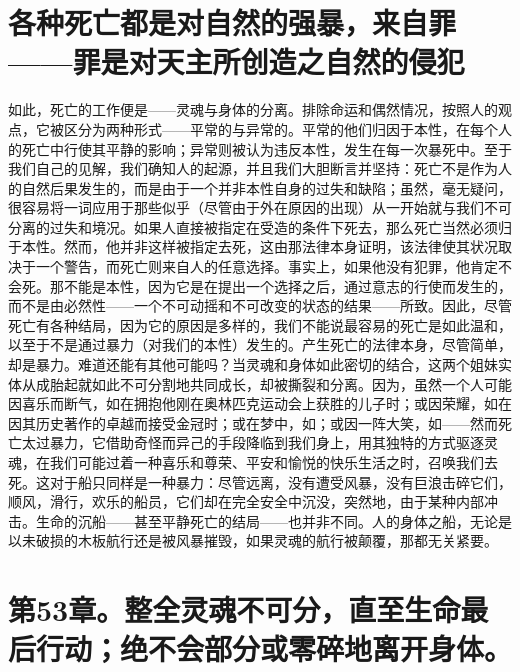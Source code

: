 
\section{各种死亡都是对自然的强暴，来自罪——罪是对天主所创造之自然的侵犯}

如此，死亡的工作便是——灵魂与身体的分离。排除命运和偶然情况，按照人的观点，它被区分为两种形式——平常的与异常的。平常的他们归因于本性，在每个人的死亡中行使其平静的影响；异常则被认为违反本性，发生在每一次暴死中。至于我们自己的见解，我们确知人的起源，并且我们大胆断言并坚持：死亡不是作为人的自然后果发生的，而是由于一个并非本性自身的过失和缺陷；虽然，毫无疑问，很容易将一词应用于那些似乎（尽管由于外在原因的出现）从一开始就与我们不可分离的过失和境况。如果人直接被指定在受造的条件下死去，那么死亡当然必须归于本性。然而，他并非这样被指定去死，这由那法律本身证明，该法律使其状况取决于一个警告，而死亡则来自人的任意选择。事实上，如果他没有犯罪，他肯定不会死。那不能是本性，因为它是在提出一个选择之后，通过意志的行使而发生的，而不是由必然性——一个不可动摇和不可改变的状态的结果——所致。因此，尽管死亡有各种结局，因为它的原因是多样的，我们不能说最容易的死亡是如此温和，以至于不是通过暴力（对我们的本性）发生的。产生死亡的法律本身，尽管简单，却是暴力。难道还能有其他可能吗？当灵魂和身体如此密切的结合，这两个姐妹实体从成胎起就如此不可分割地共同成长，却被撕裂和分离。因为，虽然一个人可能因喜乐而断气，如在拥抱他刚在奥林匹克运动会上获胜的儿子时；或因荣耀，如在因其历史著作的卓越而接受金冠时；或在梦中，如；或因一阵大笑，如——然而死亡太过暴力，它借助奇怪而异己的手段降临到我们身上，用其独特的方式驱逐灵魂，在我们可能过着一种喜乐和尊荣、平安和愉悦的快乐生活之时，召唤我们去死。这对于船只同样是一种暴力：尽管远离，没有遭受风暴，没有巨浪击碎它们，顺风，滑行，欢乐的船员，它们却在完全安全中沉没，突然地，由于某种内部冲击。生命的沉船——甚至平静死亡的结局——也并非不同。人的身体之船，无论是以未破损的木板航行还是被风暴摧毁，如果灵魂的航行被颠覆，那都无关紧要。\par


\section{第53章。整全灵魂不可分，直至生命最后行动；绝不会部分或零碎地离开身体。}

